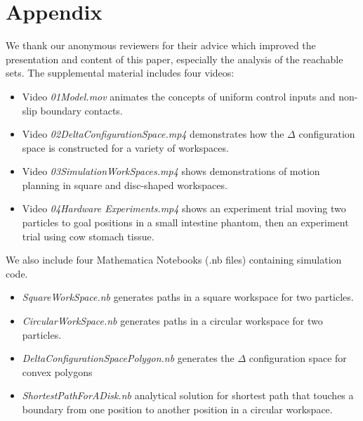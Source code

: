   \section*{Appendix}\label{sec:appendix}
We thank our anonymous reviewers for their advice which improved the presentation and content of this paper, especially the analysis of the reachable sets.
 The supplemental material includes four videos:
  	\begin{itemize}	 
 \item Video  \emph{01Model.mov} animates the concepts of uniform control inputs and non-slip boundary contacts.
 \item Video  \emph{02DeltaConfigurationSpace.mp4} demonstrates how the $\Delta$ configuration space is constructed for a variety of workspaces.
 \item Video  \emph{03SimulationWorkSpaces.mp4} shows demonstrations of motion planning in square and disc-shaped workspaces. 
 \item Video  \emph{04Hardware Experiments.mp4} shows an experiment trial moving two particles to goal positions in a small intestine phantom, then an experiment trial using cow stomach tissue.
		\end{itemize}	 	
We also include four  Mathematica Notebooks (.nb files) containing simulation code.  
		   	\begin{itemize}	 
 \item   \emph{SquareWorkSpace.nb} generates paths in a square workspace for two particles.
 \item  \emph{CircularWorkSpace.nb} generates paths in a circular workspace for two particles.
 \item   \emph{DeltaConfigurationSpacePolygon.nb} generates the $\Delta$ configuration space for convex polygons
  \item   \emph{ShortestPathForADisk.nb} analytical solution for shortest path that touches a boundary from one position to another position in a circular workspace.
		\end{itemize}	 
		   
  



